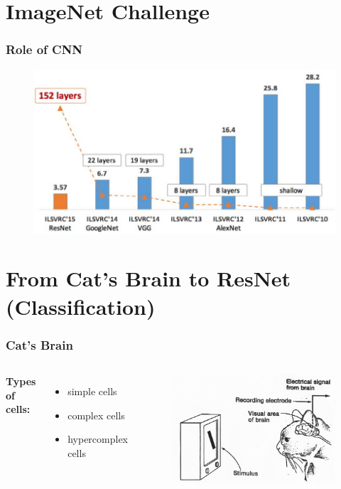 \documentclass{beamer}
\begin{document}
\section{ImageNet Challenge}
\begin{frame}
\frametitle{Role of CNN}
\begin{figure}
	\includegraphics[width=\linewidth]{Pics/imagenet_acc.png}
\end{figure}
\end{frame}

\section{From Cat's Brain to ResNet (Classification)}
\begin{frame}
\frametitle{Cat's Brain}
\begin{columns}[c]
	\textbf{Types of cells:}
\begin{itemize}
	\item simple cells
	\item complex cells
	\item hypercomplex cells
\end{itemize}

\begin{figure}
	\includegraphics[width=\linewidth]{Pics/cats.jpg}
\end{figure}
\end{columns}
\end{frame}
\end{document}
